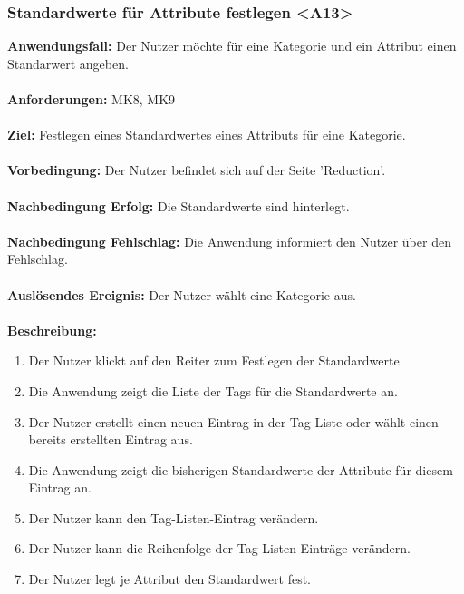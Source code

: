 \documentclass[parskip=full]{scrartcl} %
\begin{document}
\subsubsection*{Standardwerte für Attribute festlegen <A13>}
\textbf{Anwendungsfall:} Der Nutzer möchte für eine Kategorie und ein Attribut einen Standarwert angeben.\\\\
\textbf{Anforderungen:} MK8, MK9\\\\
\textbf{Ziel:} Festlegen eines Standardwertes eines Attributs für eine Kategorie. \\\\
\textbf{Vorbedingung:} Der Nutzer befindet sich auf der Seite 'Reduction'. \\\\
\textbf{Nachbedingung Erfolg:} Die Standardwerte sind hinterlegt. \\\\
\textbf{Nachbedingung Fehlschlag:} Die Anwendung informiert den Nutzer über den Fehlschlag. \\\\
\textbf{Auslösendes Ereignis:} Der Nutzer wählt eine Kategorie aus. \\\\
\textbf{Beschreibung:}
\begin{enumerate}
    \item Der Nutzer klickt auf den Reiter zum Festlegen der Standardwerte.
    \item Die Anwendung zeigt die Liste der Tags für die Standardwerte an.
    \item Der Nutzer erstellt einen neuen Eintrag in der Tag-Liste oder wählt einen bereits erstellten Eintrag aus.
    \item Die Anwendung zeigt die bisherigen Standardwerte der Attribute für diesem Eintrag an.
    \item Der Nutzer kann den Tag-Listen-Eintrag verändern.
    \item Der Nutzer kann die Reihenfolge der Tag-Listen-Einträge verändern.
    \item Der Nutzer legt je Attribut den Standardwert fest.
\end{enumerate}
\newpage
\end{document}

